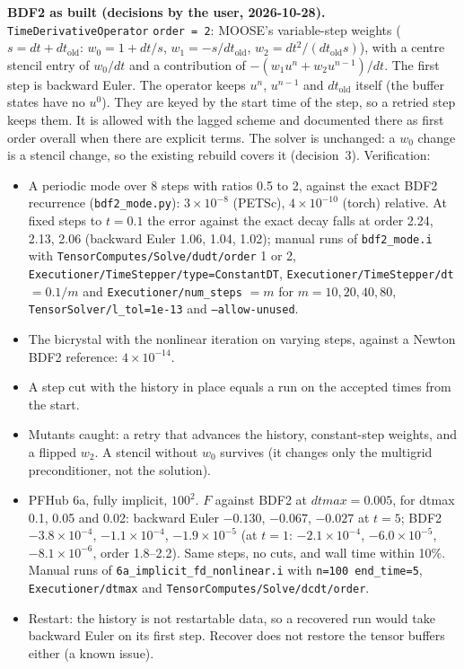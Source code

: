 \documentclass[11pt]{article}
\begin{document}
\textbf{BDF2 as built (decisions by the user, 2026-10-28).} \texttt{TimeDerivativeOperator}
\texttt{order = 2}: MOOSE's variable-step weights ($s = dt + dt_\text{old}$: $w_0 = 1 + dt/s$,
$w_1 = -s/dt_\text{old}$, $w_2 = dt^2/(dt_\text{old} s)$), with a centre stencil entry of
$w_0/dt$ and a contribution of $-(w_1 u^n + w_2 u^{n-1})/dt$. The first step is backward Euler.
The operator keeps $u^n$, $u^{n-1}$ and $dt_\text{old}$ itself (the buffer states have no
$u^0$). They are keyed by the start time of the step, so a retried step keeps them. It is
allowed with the lagged scheme and documented there as first order overall when there are
explicit terms. The solver is unchanged: a $w_0$ change is a stencil change, so the existing
rebuild covers it (decision~3). Verification:
\begin{itemize}[leftmargin=*]
\item A periodic mode over 8 steps with ratios 0.5 to 2, against the exact BDF2 recurrence
(\texttt{bdf2\_mode.py}): $3\times10^{-8}$ (PETSc), $4\times10^{-10}$ (torch) relative. At
fixed steps to $t = 0.1$ the error against the exact decay falls at order 2.24, 2.13, 2.06
(backward Euler 1.06, 1.04, 1.02); manual runs of \texttt{bdf2\_mode.i} with
\texttt{TensorComputes/Solve/dudt/order} 1 or 2,
\texttt{Executioner/TimeStepper/type=ConstantDT}, \texttt{Executioner/TimeStepper/dt} $= 0.1/m$
and \texttt{Executioner/num\_steps} $= m$ for $m = 10, 20, 40, 80$,
\texttt{TensorSolver/l\_tol=1e-13} and \texttt{--allow-unused}.
\item The bicrystal with the nonlinear iteration on varying steps, against a Newton BDF2
reference: $4\times10^{-14}$.
\item A step cut with the history in place equals a run on the accepted times from the start.
\item Mutants caught: a retry that advances the history, constant-step weights, and a flipped
$w_2$. A stencil without $w_0$ survives (it changes only the multigrid preconditioner, not the
solution).
\item PFHub 6a, fully implicit, $100^2$. $F$ against BDF2 at $dtmax = 0.005$, for dtmax 0.1, 0.05
and 0.02: backward Euler $-0.130$, $-0.067$, $-0.027$ at $t = 5$; BDF2 $-3.8\times10^{-4}$,
$-1.1\times10^{-4}$, $-1.9\times10^{-5}$ (at $t = 1$: $-2.1\times10^{-4}$, $-6.0\times10^{-5}$,
$-8.1\times10^{-6}$, order 1.8--2.2). Same steps, no cuts, and wall time within 10\%. Manual
runs of \texttt{6a\_implicit\_fd\_nonlinear.i} with \texttt{n=100 end\_time=5},
\texttt{Executioner/dtmax} and \texttt{TensorComputes/Solve/dcdt/order}.
\item Restart: the history is not restartable data, so a recovered run would take backward
Euler on its first step. Recover does not restore the tensor buffers either (a known issue).
\end{itemize}
\end{document}
